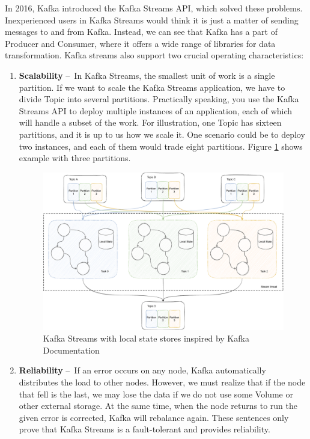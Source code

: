 In 2016, Kafka introduced the Kafka Streams API, which solved these problems. Inexperienced users in Kafka Streams would think it is just a matter of sending messages to and from Kafka. Instead, we can see that Kafka has a part of Producer and Consumer, where it offers a wide range of libraries for data transformation. Kafka streams also support two crucial operating characteristics:
\begin{enumerate}[itemsep=1mm, parsep=0pt]
    \item \textbf{Scalability} \---\ In Kafka Streams, the smallest unit of work is a single partition. If we want to scale the Kafka Streams application, we have to divide Topic into several partitions. Practically speaking, you use the Kafka Streams API to deploy multiple instances of an application, each of which will handle a subset of the work. For illustration, one Topic has sixteen partitions, and it is up to us how we scale it. One scenario could be to deploy two instances, and each of them would trade eight partitions. Figure \ref{fig:kafkaStreams} shows example with three partitions.
    
    \begin{figure}[!h]
    \centering
    \includegraphics[scale=0.48]{obrazky-figures/02-preliminaries/02-kafka/07-kafka-streams-with-localstate,thread.pdf}
    \caption{Kafka Streams with local state stores inspired by Kafka Documentation \cite{kafkaDocumentation}}
    \label{fig:kafkaStreams}
    \end{figure}
    
    
    \item \textbf{Reliability} \---\ If an error occurs on any node, Kafka automatically distributes the load to other nodes. However, we must realize that if the node that fell is the last, we may lose the data if we do not use some Volume or other external storage. At the same time, when the node returns to run the given error is corrected, Kafka will rebalance again. These sentences only prove that Kafka Streams is a fault-tolerant and provides reliability.
\end{enumerate}

